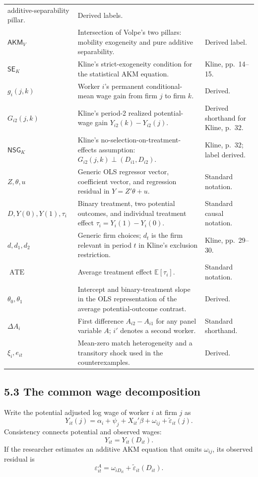 \documentclass[11pt]{article}
\begin{document}
\begin{longtable}{p{}p{}p{}}
additive-separability pillar. & Derived labels. \\
\(\mathsf{AKM}_{V}\) & Intersection of Volpe's two pillars: mobility
exogeneity and pure additive separability. & Derived label. \\
\(\mathsf{SE}_{K}\) & Kline's strict-exogeneity condition for the statistical
AKM equation. & Kline, pp.\ 14--15. \\
\(g_i(j,k)\) & Worker \(i\)'s permanent conditional-mean wage gain from firm
\(j\) to firm \(k\). & Derived. \\
\(G_{i2}(j,k)\) & Kline's period-2 realized potential-wage gain
\(Y_{i2}(k)-Y_{i2}(j)\). & Derived shorthand for Kline, p.\ 32. \\
\(\mathsf{NSG}_{K}\) & Kline's no-selection-on-treatment-effects assumption:
\(G_{i2}(j,k)\perp(D_{i1},D_{i2})\). & Kline, p.\ 32; label derived. \\
\(Z,\theta,u\) & Generic OLS regressor vector, coefficient vector, and
regression residual in \(Y=Z'\theta+u\). & Standard notation. \\
\(D,Y(0),Y(1),\tau_i\) & Binary treatment, two potential outcomes, and
individual treatment effect \(\tau_i=Y_i(1)-Y_i(0)\). & Standard causal
notation. \\
\(d,d_1,d_2\) & Generic firm choices; \(d_t\) is the firm relevant in period
\(t\) in Kline's exclusion restriction. & Kline, pp.\ 29--30. \\
\(\operatorname{ATE}\) & Average treatment effect
\(\mathbb E[\tau_i]\). & Standard notation. \\
\(\theta_0,\theta_1\) & Intercept and binary-treatment slope in the OLS
representation of the average potential-outcome contrast. & Derived. \\
\(\Delta A_i\) & First difference \(A_{i2}-A_{i1}\) for any panel variable
\(A\); \(i'\) denotes a second worker. & Standard shorthand. \\
\(\xi_i,e_{it}\) & Mean-zero match heterogeneity and a transitory shock used
in the counterexamples. & Derived. \\
\end{longtable}

\subsection{5.3 The common wage decomposition}

Write the potential adjusted log wage of worker \(i\) at firm \(j\) as
\[
Y_{it}(j)
=
\alpha_i+\psi_j+X_{it}'\beta
+\omega_{ij}
+\widetilde\varepsilon_{it}(j).
\tag{T5.1}
\]
Consistency connects potential and observed wages:
\[
Y_{it}=Y_{it}(D_{it}).
\tag{T5.2}
\]
If the researcher estimates an additive AKM equation that omits
\(\omega_{ij}\), its observed residual is
\[
\varepsilon^A_{it}
=
\omega_{iD_{it}}
+\widetilde\varepsilon_{it}(D_{it}).
\tag{T5.3}
\]
\end{document}
